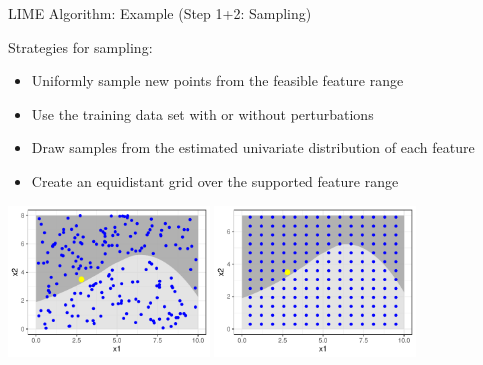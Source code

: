 \documentclass[11pt,compress,t,notes=noshow, aspectratio=169, xcolor=table]{beamer}
\begin{document}
\begin{frame}[c]{LIME Algorithm: Example (Step 1+2: Sampling) }
		
		Strategies for sampling: 
		\begin{itemize} 
			\item Uniformly sample new points from the feasible feature range 
			\item Use the training data set with or without perturbations
			\item Draw samples from the estimated univariate distribution of each feature
			\item Create an equidistant grid over the supported feature range  
		\end{itemize}
		\begin{center}
			\includegraphics[width=0.4\textwidth]{figure/lime3} \hspace{0.1cm}
			\includegraphics[width=0.4\textwidth]{figure/lime3a}
		\end{center}

\end{frame}
		
\end{document}
